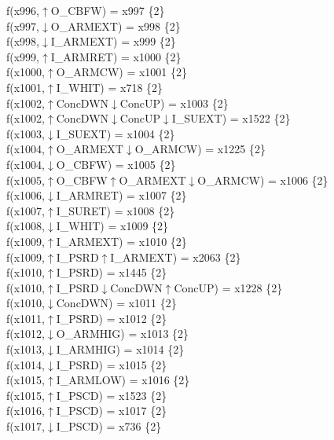 f(x996,$\uparrow$O\_CBFW) = x997 \{2\} \\  
f(x997,$\downarrow$O\_ARMEXT) = x998 \{2\} \\  
f(x998,$\downarrow$I\_ARMEXT) = x999 \{2\} \\  
f(x999,$\uparrow$I\_ARMRET) = x1000 \{2\} \\  
f(x1000,$\uparrow$O\_ARMCW) = x1001 \{2\} \\  
f(x1001,$\uparrow$I\_WHIT) = x718 \{2\} \\  
f(x1002,$\uparrow$ConcDWN$\downarrow$ConcUP) = x1003 \{2\} \\  
f(x1002,$\uparrow$ConcDWN$\downarrow$ConcUP$\downarrow$I\_SUEXT) = x1522 \{2\} \\  
f(x1003,$\downarrow$I\_SUEXT) = x1004 \{2\} \\  
f(x1004,$\uparrow$O\_ARMEXT$\downarrow$O\_ARMCW) = x1225 \{2\} \\  
f(x1004,$\downarrow$O\_CBFW) = x1005 \{2\} \\  
f(x1005,$\uparrow$O\_CBFW$\uparrow$O\_ARMEXT$\downarrow$O\_ARMCW) = x1006 \{2\} \\  
f(x1006,$\downarrow$I\_ARMRET) = x1007 \{2\} \\  
f(x1007,$\uparrow$I\_SURET) = x1008 \{2\} \\  
f(x1008,$\downarrow$I\_WHIT) = x1009 \{2\} \\  
f(x1009,$\uparrow$I\_ARMEXT) = x1010 \{2\} \\  
f(x1009,$\uparrow$I\_PSRD$\uparrow$I\_ARMEXT) = x2063 \{2\} \\  
f(x1010,$\uparrow$I\_PSRD) = x1445 \{2\} \\  
f(x1010,$\uparrow$I\_PSRD$\downarrow$ConcDWN$\uparrow$ConcUP) = x1228 \{2\} \\  
f(x1010,$\downarrow$ConcDWN) = x1011 \{2\} \\  
f(x1011,$\uparrow$I\_PSRD) = x1012 \{2\} \\  
f(x1012,$\downarrow$O\_ARMHIG) = x1013 \{2\} \\  
f(x1013,$\downarrow$I\_ARMHIG) = x1014 \{2\} \\  
f(x1014,$\downarrow$I\_PSRD) = x1015 \{2\} \\  
f(x1015,$\uparrow$I\_ARMLOW) = x1016 \{2\} \\  
f(x1015,$\uparrow$I\_PSCD) = x1523 \{2\} \\  
f(x1016,$\uparrow$I\_PSCD) = x1017 \{2\} \\  
f(x1017,$\downarrow$I\_PSCD) = x736 \{2\} \\  
